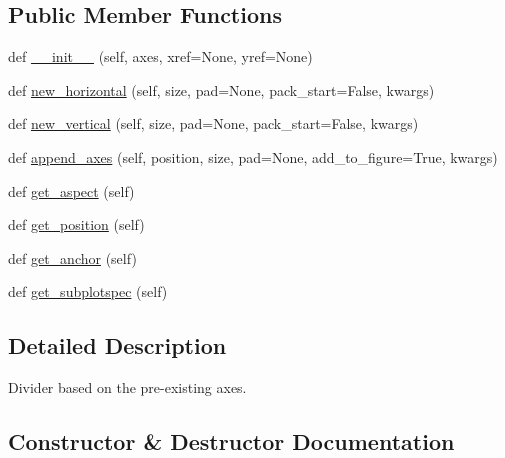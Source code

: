 \subsection*{Public Member Functions}
\begin{DoxyCompactItemize}
\item 
def \hyperlink{classaxes__grid1_1_1axes__divider_1_1AxesDivider_a837ff338f91cdc4d0241f12741aa08c3}{\+\_\+\+\_\+init\+\_\+\+\_\+} (self, axes, xref=None, yref=None)
\item 
def \hyperlink{classaxes__grid1_1_1axes__divider_1_1AxesDivider_ad1c8daddcafd47c4840ecb58be867e02}{new\+\_\+horizontal} (self, size, pad=None, pack\+\_\+start=False, kwargs)
\item 
def \hyperlink{classaxes__grid1_1_1axes__divider_1_1AxesDivider_a7adcf33e8b28807377decf7190612790}{new\+\_\+vertical} (self, size, pad=None, pack\+\_\+start=False, kwargs)
\item 
def \hyperlink{classaxes__grid1_1_1axes__divider_1_1AxesDivider_ae90543d0002a36bc6de3f30bee28ad2e}{append\+\_\+axes} (self, position, size, pad=None, add\+\_\+to\+\_\+figure=True, kwargs)
\item 
def \hyperlink{classaxes__grid1_1_1axes__divider_1_1AxesDivider_a9fba900c20712e1a2d727d07ae0a5637}{get\+\_\+aspect} (self)
\item 
def \hyperlink{classaxes__grid1_1_1axes__divider_1_1AxesDivider_a7dc68283c78eae1f90a80cc2535af434}{get\+\_\+position} (self)
\item 
def \hyperlink{classaxes__grid1_1_1axes__divider_1_1AxesDivider_a0f543a587b0812d4f9825fb3a5f61c11}{get\+\_\+anchor} (self)
\item 
def \hyperlink{classaxes__grid1_1_1axes__divider_1_1AxesDivider_ac80b623ab51b7007e3e1698c2bbcdc26}{get\+\_\+subplotspec} (self)
\end{DoxyCompactItemize}


\subsection{Detailed Description}
\begin{DoxyVerb}Divider based on the pre-existing axes.
\end{DoxyVerb}
 

\subsection{Constructor \& Destructor Documentation}
\mbox{\label{classaxes__grid1_1_1axes__divider_1_1AxesDivider_a837ff338f91cdc4d0241f12741aa08c3}} 
